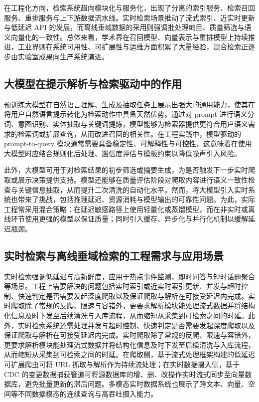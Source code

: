 在工程化方向，检索系统趋向模块化与服务化，出现了分离的索引服务、检索召回服务、重排服务与上下游数据流水线\cite{10.1145/3726302.3730351}。实时检索场景推动了流式索引、近实时更新与低延迟 API 的发展，而离线垂域数据的采用则强调批处理编目、质量筛选与语义向量化的一致性。总体来看，学术界在召回模型、向量表示与重排模型上持续推进，工业界则在系统可用性、可扩展性与运维方面积累了大量经验，混合检索正逐步由实验室成果向生产系统演进。

\subsection{大模型在提示解析与检索驱动中的作用} 
预训练大模型在自然语言理解、生成及抽取任务上展示出强大的通用能力，使其在将用户自然语言提示转化为检索动作中具备天然优势。通过对 prompt 进行语义分词、意图识别、实体抽取与关键词提炼，模型能够为检索器提供更符合用户语义需求的检索词或扩展查询，从而改进召回的相关性。在工程实践中，模型驱动的 prompt-to-query 模块\cite{li2023agent4rankingsemanticrobustranking}通常需要具备稳定性、可解释性与可控性，这意味着在使用大模型时应结合规则化后处理、置信度评估与模板约束以降低噪声引入风险\cite{huang2026qponemodelunifiedgenerativellm}。

此外，大模型可用于对检索结果的初步筛选或摘要生成，为是否触发下一步实时爬取或展示决策提供支持。模型还能够在质量评估阶段对爬取内容进行语义一致性检查与关键信息抽取\cite{zhang-etal-2025-structured}，从而提升二次清洗的自动化水平。然而，将大模型引入实时系统也带来了挑战，包括推理延迟、资源消耗与模型输出的可靠性问题\cite{shachar2025nerretrieverzeroshotnamed}。为此，实际工程常采用混合策略：在延迟敏感路径上使用轻量化或蒸馏模型，而在非实时或离线环节使用更强的模型以保证质量；同时引入缓存、异步化与并行化机制以缓解延迟瓶颈。

\subsection{实时检索与离线垂域检索的工程需求与应用场景} 
实时检索强调低延迟与高新鲜度\cite{li2023realtime}，应用于热点事件监测、即时问答与短时话题聚合等场景。工程上需要解决的问题包括实时索引或近实时索引更新\cite{chen2024near}、并发与超时控制\cite{wang2023concurrency}、快速判定是否需要发起深度爬取\cite{zhang2024deep}以及保证爬取与解析在可接受延迟内完成\cite{zhao2023lowlatency}。实时爬取除了常规的反爬、限速与容错外，更要求解析模块能处理流式数据并将结构化信息及时下发至后续清洗与入库流程，从而缩短从采集到可检索之间的时延。此外，实时检索系统还需处理并发与超时控制、快速判定是否需要发起深度爬取以及保证爬取与解析在可接受延迟内完成。实时爬取除了常规的反爬、限速与容错外，更要求解析模块能处理流式数据并将结构化信息及时下发至后续清洗与入库流程，从而缩短从采集到可检索之间的时延。在爬取侧，基于流式处理框架构建的低延迟可扩展爬虫可将 URL 抓取与解析作为持续流处理\cite{stormcrawler}；在实时数据摄入侧，基于 CDC 的变更数据捕获管道可将源数据库的增、删、改操作实时流式同步至向量数据库，避免批量更新的滞后问题。多模态实时数据系统也展示了跨文本、向量、空间等不同数据模态的连续查询与高吞吐摄入能力。

